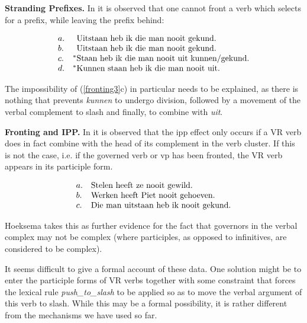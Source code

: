 {\bf Stranding Prefixes.}
In  it is observed that one cannot front a verb which 
selects for a prefix, while leaving the prefix behind:

\begin{equation}
\label{fronting3}
\begin{array}[t]{ll@{\hspace{0cm}}l}
a. && \mbox{Uitstaan heb ik die man nooit gekund.} \\
b. && \mbox{Uitstaan heb ik die man nooit gekund.} \\ 
c. &^*& \mbox{Staan heb ik die man nooit uit kunnen/gekund.} \\
d. &^*& \mbox{Kunnen staan heb ik die man nooit uit.} \\
\end{array} 
\end{equation}

\noindent The impossibility of (\ref{fronting3}c) in particular needs to be 
explained, as there is nothing that prevents {\em kunnen} to undergo division, 
followed by a movement of the verbal complement to {\sc slash} and finally, to 
combine with {\em uit}. 


{\bf Fronting and IPP.}  In  it is observed that the {\sc
ipp} effect only occurs if a VR verb does in fact combine with the head of its
complement in the verb cluster.  If this is not the case, i.e.  if the governed
verb or {\sc vp} has been fronted, the VR verb appears in its participle form.

\begin{equation}
\label{fronting-ipp}
\begin{array}[t]{ll@{\hspace{0cm}}l}
a. && \mbox{Stelen heeft ze nooit gewild.} \\
b. && \mbox{Werken heeft Piet nooit gehoeven.}\\
c. && \mbox{Die man uitstaan heb ik nooit gekund.}\\
\end{array}
\end{equation}

\noindent Hoeksema takes this as further evidence for the fact that governors in 
the verbal complex may not be complex (where participles, as opposed to 
infinitives, are considered to be complex). 

It seems difficult to give a formal account of these data. One solution might be 
to enter the participle forms of VR verbs together with some constraint that 
forces the lexical rule {\em push\_to\_slash} to be applied so as to move the 
verbal argument of this verb to  {\sc slash}. While this may be a formal 
possibility, it is rather different from the mechanisms we have used so far. 

